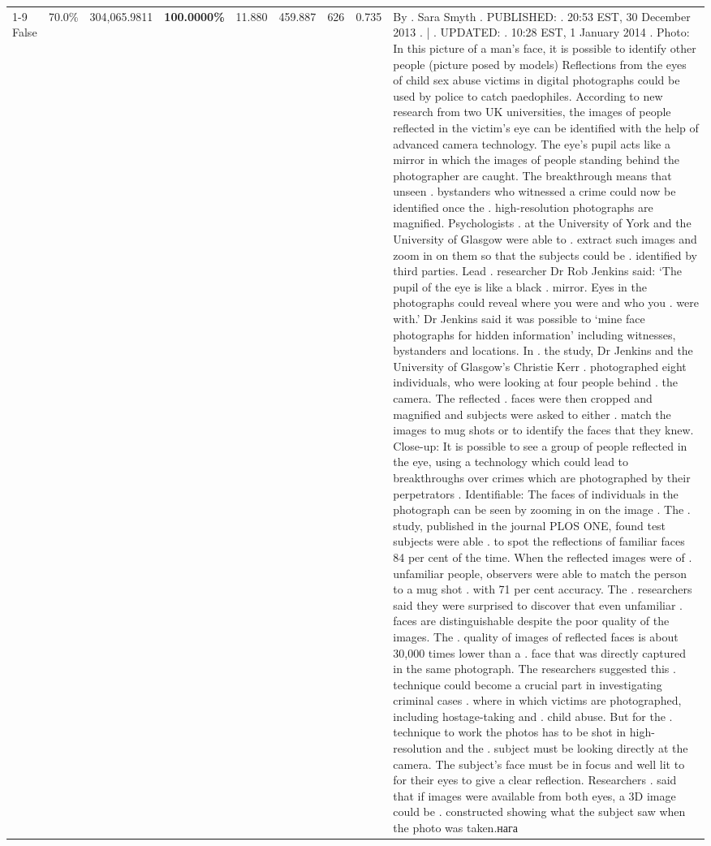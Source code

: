 \begin{table}[H]
\begin{tabular}{lllrlllll}
\cline{1-9}
False & 70.0\% & \color{red} 304,065.9811 & \bfseries \color{red} 100.0000\% & 11.880 & 459.887 & 626 & 0.735 & By . Sara Smyth . PUBLISHED: . 20:53 EST, 30 December 2013 . | . UPDATED: . 10:28 EST, 1 January 2014 . Photo: In this picture of a man's face, it is possible to identify other people (picture posed by models) Reflections from the eyes of child sex abuse victims in digital photographs could be used by police to catch paedophiles. According to new research from two UK universities, the images of people reflected in the victim's eye can be identified with the help of advanced camera technology. The eye's pupil acts like a mirror in which the images of people standing behind the photographer are caught. The breakthrough means that unseen . bystanders who witnessed a crime could now be identified once the . high-resolution photographs are magnified. Psychologists . at the University of York and the University of Glasgow were able to . extract such images and zoom in on them so that the subjects could be . identified by third parties. Lead . researcher Dr Rob Jenkins said: ‘The pupil of the eye is like a black . mirror. Eyes in the photographs could reveal where you were and who you . were with.' Dr Jenkins said it was possible to ‘mine face photographs for hidden information' including witnesses, bystanders and locations. In . the study, Dr Jenkins and the University of Glasgow's Christie Kerr . photographed eight individuals, who were looking at four people behind . the camera. The reflected . faces were then cropped and magnified and subjects were asked to either . match the images to mug shots or to identify the faces that they knew. Close-up: It is possible to see a group of people reflected in the eye, using a technology which could lead to breakthroughs over crimes which are photographed by their perpetrators . Identifiable: The faces of individuals in the photograph can be seen by zooming in on the image . The . study, published in the journal PLOS ONE, found test subjects were able . to spot the reflections of familiar faces 84 per cent of the time. When the reflected images were of . unfamiliar people, observers were able to match the person to a mug shot . with 71 per cent accuracy. The . researchers said they were surprised to discover that even unfamiliar . faces are distinguishable despite the poor quality of the images. The . quality of images of reflected faces is about 30,000 times lower than a . face that was directly captured in the same photograph. The researchers suggested this . technique could become a crucial part in investigating criminal cases . where in which victims are photographed, including hostage-taking and . child abuse. But for the . technique to work the photos has to be shot in high-resolution and the . subject must be looking directly at the camera. The subject's face must be in focus and well lit to for their eyes to give a clear reflection. Researchers . said that if images were available from both eyes, a 3D image could be . constructed showing what the subject saw when the photo was taken.нага \\

\end{tabular}
\end{table}
